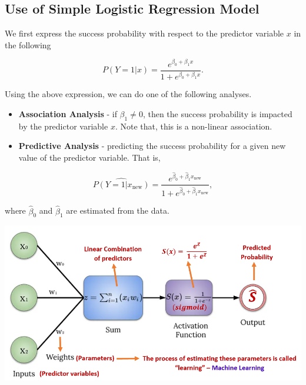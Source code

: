 \documentclass[
]{book}
\begin{document}
\hypertarget{use-of-simple-logistic-regression-model}{%
\subsection{Use of Simple Logistic Regression Model}\label{use-of-simple-logistic-regression-model}}

We first express the success probability with respect to the predictor variable \(x\) in the following

\[
P(Y=1|x) = \frac{e^{\beta_0 + \beta_1x}}{1+e^{\beta_0 + \beta_1x}}.
\]

Using the above expression, we can do one of the following analyses.

\begin{itemize}
\item
  \textbf{Association Analysis} - if \(\beta_1 \ne 0\), then the success probability is impacted by the predictor variable \(x\). Note that, this is a non-linear association.
\item
  \textbf{Predictive Analysis} - predicting the success probability for a given new value of the predictor variable. That is,
\end{itemize}

\[
\widehat{P(Y=1|x_\text{new})} = \frac{e^{\hat{\beta}_0 + \hat{\beta}_1x_\text{new}}}{1+e^{\hat{\beta}_0 + \hat{\beta}_1x_\text{new}}},
\]

where \(\hat{\beta}_0\) and \(\hat{\beta}_1\) are estimated from the data.

\begin{center}\includegraphics[width=0.9\linewidth]{img06/w06-ANN} \end{center}
\end{document}
